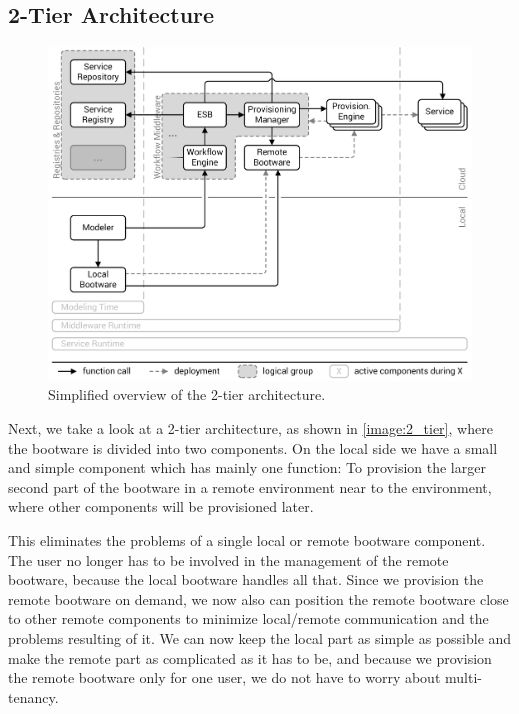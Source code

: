 \subsection{2-Tier Architecture}
\label{design:division:2tier}

\begin{figure}[!htbp]
	\centering
	\includegraphics[resolution=600]{design/assets/2_tier}
	\caption{Simplified overview of the 2-tier architecture.}
	\label{image:2_tier}
\end{figure}

Next, we take a look at a 2-tier architecture, as shown in \autoref{image:2_tier}, where the bootware is divided into two components.
On the local side we have a small and simple component which has mainly one function: To provision the larger second part of the bootware in a remote environment near to the environment, where other components will be provisioned later.

This eliminates the problems of a single local or remote bootware component.
The user no longer has to be involved in the management of the remote bootware, because the local bootware handles all that.
Since we provision the remote bootware on demand, we now also can position the remote bootware close to other remote components to minimize local/remote communication and the problems resulting of it.
We can now keep the local part as simple as possible and make the remote part as complicated as it has to be, and because we provision the remote bootware only for one user, we do not have to worry about multi-tenancy.

